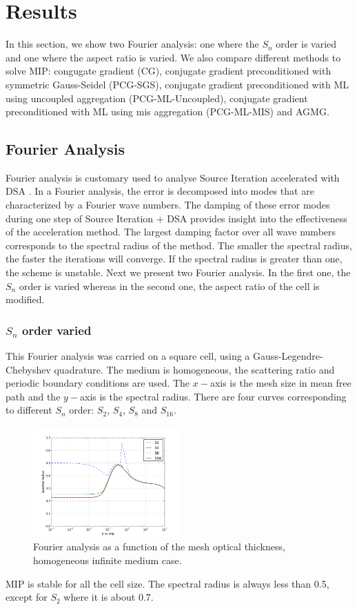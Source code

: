 \section{Results} \label{sec_res}
In this section, we show two Fourier analysis: one where the $S_n$ order is
varied and one where the aspect ratio is varied. We also compare different
methods to solve MIP: congugate gradient (CG), conjugate gradient
preconditioned with symmetric Gauss-Seidel (PCG-SGS), conjugate gradient
preconditioned with ML using uncoupled aggregation (PCG-ML-Uncoupled),
conjugate gradient preconditioned with ML using mis aggregation (PCG-ML-MIS)
and AGMG.
\subsection{Fourier Analysis}
Fourier analysis is customary used to analyse Source Iteration accelerated
with DSA \cite{larsen_dsa,consistent_p1}. In a Fourier analysis, the error is
decomposed into modes that are characterized by a Fourier wave numbers. The
damping of these error modes during one step of Source Iteration + DSA
provides insight into the effectiveness of the acceleration method. The
largest damping factor over all wave numbers corresponds to the spectral
radius of the method. The smaller the spectral radius, the faster the
iterations will converge. If the spectral radius is greater than one, the
scheme is unstable. Next we present two Fourier analysis. In the first one,
the $S_n$ order is varied whereas in the second one, the aspect ratio of the 
cell is modified.
\subsubsection{$S_n$ order varied}
This Fourier analysis was carried on a square cell, using a
Gauss-Legendre-Chebyshev quadrature. The medium is homogeneous, the scattering
ratio  and periodic boundary conditions are used. The $x-$axis is the mesh
size in mean free path and the $y-$axis is the spectral radius. There are four
curves corresponding to different $S_n$ order: $S_2$, $S_4$, $S_8$ and
$S_{16}$.
\begin{figure}[H]
\centering
\includegraphics[width=0.5\textwidth]{sn_order}
\caption{Fourier analysis as a function of the mesh optical thickness,
homogeneous infinite medium case.}
\end{figure}
MIP is stable for all the cell size. The spectral radius is always less than
0.5, except for $S_2$ where it is about 0.7.
